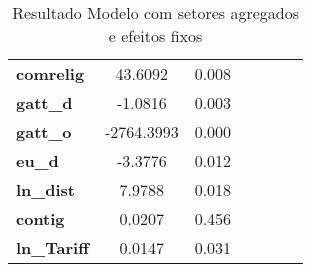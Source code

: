 \begin{table}[ht]
\begin{center}
\begin{tabular}{lcccccc}
\textbf{comrelig}                                                  &      43.6092 &        0.008       \\
\textbf{gatt\_d}                                                   &      -1.0816 &        0.003       \\
\textbf{gatt\_o}                                                   &   -2764.3993 &        0.000       \\
\textbf{eu\_d}                                                     &      -3.3776 &        0.012       \\
\textbf{ln\_dist}                                                  &       7.9788 &        0.018       \\
\textbf{contig}                                                    &       0.0207 &        0.456       \\
\textbf{ln\_Tariff}                                                &       0.0147 &        0.031       \\
\bottomrule
\end{tabular}
\end{center}
\caption{Resultado Modelo com setores agregados e efeitos fixos}
\end{table}